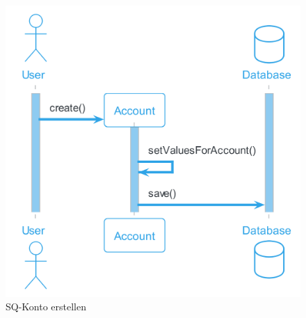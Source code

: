 \begin{figure}[H]
  \begin{center}
    \includegraphics[width=0.5\textheight]{content/diagrams/out/sequenzdiagram/kontoErstellen/KontoErstellen.png}
    \caption{SQ-Konto erstellen}

  \end{center}
\end{figure}

